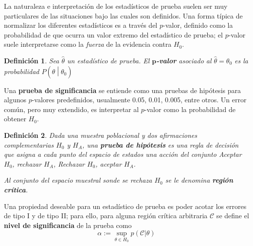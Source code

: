 \documentclass[12pt,letterpaper]{book}
\newtheorem{definicion}{Definición}[chapter]
\newcommand{\talque}{\mathrel{}\middle|\mathrel{}}
\begin{document}
La naturaleza e interpretación de los estadísticos de prueba suelen ser muy particulares de las situaciones bajo las cuales son definidos.
%
Una forma típica de normalizar los diferentes estadísticos es a través del $p$-valor, definido como la probabilidad de que ocurra un valor extremo del estadístico de prueba; 
el $p$-valor suele interpretarse como la \textit{fuerza} de la evidencia contra $H_0$.

\begin{definicion}
Sea $\widehat{\theta}$ un estadístico de prueba. El \textbf{$\boldsymbol{p}$-valor} asociado al $\widehat{\theta}=\theta_0$ es la probabilidad $P\left(\widehat{\theta} \talque \theta_0\right)$
\end{definicion}

Una \textbf{prueba de significancia} se entiende como una pruebas de hipótesis para algunos $p$-valores predefinidos, usualmente 0.05, 0.01, 0.005, entre otros.
%
Un error común, pero muy extendido, es interpretar al $p$-valor como la probabilidad de obtener $H_0$.

\begin{definicion}
Dada una muestra poblacional y dos afirmaciones complementarias $H_0$ y $H_A$, una \textbf{prueba de hipótesis} es una regla de decisión que asigna a cada punto del espacio de estados una acción del conjunto Aceptar $H_0$, rechazar $H_A$, Rechazar $H_0$, aceptar $H_A$.

Al conjunto del espacio muestral sonde se rechaza $H_0$ se le denomina \textbf{región crítica}. 
\end{definicion}

Una propiedad deseable para un estadístico de prueba es poder acotar los errores de tipo I y de tipo II; para ello, para alguna región crítica arbitraria $\mathcal{C}$ se define el \textbf{nivel de significancia} de la prueba como
\begin{equation}
\alpha := \sup_{\theta \in H_0} p(\mathcal{C} \lvert \theta)
\end{equation}

\end{document}
